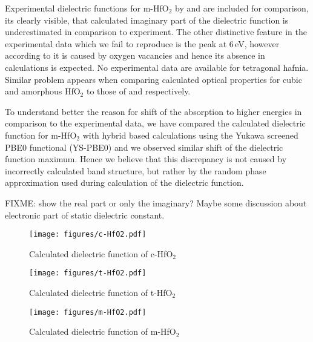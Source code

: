 \documentclass[10pt,a4paper,twocolumn]{article}
\begin{document}
Experimental dielectric functions for m-HfO$_2$ by \citet{Edwards2003} and \citet{Nguyen2005} are included for comparison, its clearly visible, that calculated imaginary part of the dielectric function is underestimated in comparison to experiment.
The other distinctive feature in the experimental data which we fail to reproduce is the peak at 6\,eV, however according to \cite{Takeuchi2004} it is caused by oxygen vacancies and hence its absence in calculations is expected.
No experimental data are available for tetragonal hafnia.
Similar problem appears when comparing calculated optical properties for cubic and amorphous HfO$_2$ to those of \citet{Lim2002} and \citet{Nguyen2005} respectively.

To understand better the reason for shift of the absorption to higher energies in comparison to the experimental data, we have compared the calculated dielectric function for m-HfO$_2$ with hybrid based calculations using the Yukawa screened PBE0 functional (YS-PBE0) \cite{Tran2011} and we observed similar shift of the dielectric function maximum.
Hence we believe that this discrepancy is not caused by incorrectly calculated band structure, but rather by the random phase approximation used during calculation of the dielectric function.

FIXME: show the real part or only the imaginary? Maybe some discussion about electronic part of static dielectric constant.

\begin{figure}
\begin{center}
	\texttt{[image: figures/c-HfO2.pdf]}
	\caption{Calculated dielectric function of c-HfO$_2$}
   \label{eps-cHfO2}
\end{center}
\end{figure}

\begin{figure}
\begin{center}
	\texttt{[image: figures/t-HfO2.pdf]}
	\caption{Calculated dielectric function of t-HfO$_2$}
   \label{eps-tHfO2}
\end{center}
\end{figure}

\begin{figure}
\begin{center}
	\texttt{[image: figures/m-HfO2.pdf]}
	\caption{Calculated dielectric function of m-HfO$_2$}
   \label{eps-mHfO2}
\end{center}
\end{figure}
\end{document}
